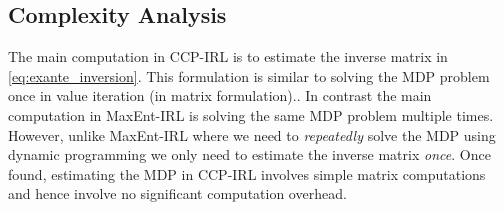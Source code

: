 \documentclass{article}
\begin{document}
%


\subsection{Complexity Analysis}
The main computation in CCP-IRL is to estimate the inverse matrix in \eqref{eq:exante_inversion}. This formulation is similar to solving the MDP problem once in value iteration (in matrix formulation).\cite{?Putterman}. 
In contrast the main computation in MaxEnt-IRL is solving the same MDP problem multiple times.
However, unlike MaxEnt-IRL where we need to \textit{repeatedly} solve the MDP using dynamic programming we only need to estimate the inverse matrix \textit{once}.
Once found, estimating the MDP in CCP-IRL involves simple matrix computations and hence involve no significant computation overhead.
\end{document}
